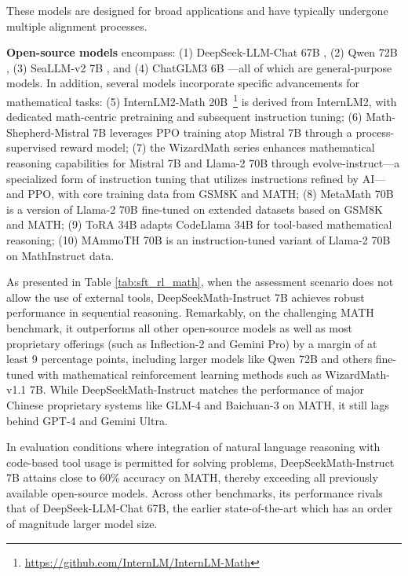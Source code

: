 These models are designed for broad applications and have typically undergone multiple alignment processes.

\item \textbf{Open-source models} encompass: (1) DeepSeek-LLM-Chat 67B \citep{deepseek-llm}, (2) Qwen 72B \citep{qwen}, (3) SeaLLM-v2 7B \citep{seallm}, and (4) ChatGLM3 6B \citep{chatglm3}—all of which are general-purpose models. In addition, several models incorporate specific advancements for mathematical tasks: (5) InternLM2-Math 20B~\footnote{\url{https://github.com/InternLM/InternLM-Math}} is derived from InternLM2, with dedicated math-centric pretraining and subsequent instruction tuning; (6) Math-Shepherd-Mistral 7B leverages PPO training \citep{schulman2017proximal} atop Mistral 7B \citep{mistral} through a process-supervised reward model; (7) the WizardMath series \citep{wizardmath} enhances mathematical reasoning capabilities for Mistral 7B and Llama-2 70B \citep{llama2} through evolve-instruct—a specialized form of instruction tuning that utilizes instructions refined by AI—and PPO, with core training data from GSM8K and MATH; (8) MetaMath 70B \citep{metamath} is a version of Llama-2 70B fine-tuned on extended datasets based on GSM8K and MATH; (9) ToRA 34B \cite{tora} adapts CodeLlama 34B for tool-based mathematical reasoning; (10) MAmmoTH 70B \citep{MathInstruct} is an instruction-tuned variant of Llama-2 70B on MathInstruct data.

As presented in Table \ref{tab:sft_rl_math}, when the assessment scenario does not allow the use of external tools, DeepSeekMath-Instruct 7B achieves robust performance in sequential reasoning. Remarkably, on the challenging MATH benchmark, it outperforms all other open-source models as well as most proprietary offerings (such as Inflection-2 and Gemini Pro) by a margin of at least 9 percentage points, including larger models like Qwen 72B and others fine-tuned with mathematical reinforcement learning methods such as WizardMath-v1.1 7B. While DeepSeekMath-Instruct matches the performance of major Chinese proprietary systems like GLM-4 and Baichuan-3 on MATH, it still lags behind GPT-4 and Gemini Ultra.

In evaluation conditions where integration of natural language reasoning with code-based tool usage is permitted for solving problems, DeepSeekMath-Instruct 7B attains close to 60\% accuracy on MATH, thereby exceeding all previously available open-source models. Across other benchmarks, its performance rivals that of DeepSeek-LLM-Chat 67B, the earlier state-of-the-art which has an order of magnitude larger model size.

